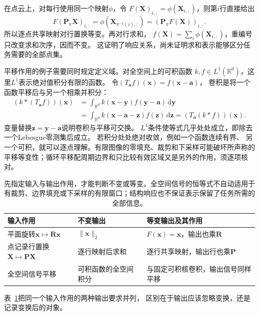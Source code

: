 在点云上，对每行使用同一个映射$\phi$，令
$F(\bm X)_{i,:}=\phi(\bm X_{i,:})$，则第$i$行直接给出
\[
 F(\bm P_\pi\bm X)_{i,:}
 =\phi(\bm X_{\pi^{-1}(i),:})
 =(\bm P_\pi F(\bm X))_{i,:}.
\]
所以逐点共享映射对行置换等变。再对行求和，
$f(\bm X)=\sum_i\phi(\bm X_{i,:})$，重编号只改变求和次序，因而不变。
这证明了响应关系，尚未证明求和表示能够区分任务需要的全部点集。

平移作用的例子需要同时规定定义域。对全空间上的可积函数
$k,f\in L^1(\mathbb R^d)$，这里$L^1$表示绝对值积分有限的函数。
令$(T_{\bm a}f)(\bm x)=f(\bm x-\bm a)$，
卷积是将一个函数平移后与另一个相乘并积分：
\begin{align}
 (k*(T_{\bm a}f))(\bm x)
 &=\int_{\mathbb R^d}k(\bm x-\bm y)f(\bm y-\bm a)\,\mathrm d\bm y\\
 &=\int_{\mathbb R^d}k(\bm x-\bm a-\bm z)f(\bm z)\,\mathrm d\bm z
   =(T_{\bm a}(k*f))(\bm x).
 \label{eq:geometry-translation-convolution-equivariance}
\end{align}
变量替换$\bm z=\bm y-\bm a$说明卷积与平移可交换。
$L^1$条件使等式几乎处处成立，即除去一个Lebesgue零测集后成立。
若积分处处绝对收敛，例如一个函数连续有界、
另一个可积，就可以逐点理解。有限图像的零填充、裁剪和下采样可能破坏所声称的
平移等变性；循环平移配周期边界和只比较有效区域又是另外的作用，须逐项核对。

\begin{table}[htbp]
 \centering\small
 \begin{tabularx}{\linewidth}{@{}lXX@{}}
 \toprule
 输入作用 & 不变输出 & 等变输出及其作用\\
 \midrule
 平面旋转$\bm x\mapsto\bm R\bm x$
 & $\lVert\bm x\rVert_2$ & $F(\bm x)=\bm x$，输出也乘$\bm R$\\
 点记录行置换$\bm X\mapsto\bm P\bm X$
 & 逐行映射后求和 & 逐行共享映射，输出行也乘$\bm P$\\
 全空间信号平移
 & 可积函数的全空间积分 & 与固定可积核卷积，输出信号同样平移\\
 \bottomrule
 \end{tabularx}
 \caption{先指定输入与输出作用，才能判断不变或等变。全空间信号的恒等式不自动适用于
 有裁剪、边界填充或下采样的有限窗口；结构响应也不保证表示保留了任务所需的全部信息。}
 \label{tab:geometry-invariance-equivariance}
\end{table}
表~\ref{tab:geometry-invariance-equivariance}把同一个输入作用的两种输出要求并列，
区别在于输出应该忽略变换，还是记录变换后的对象。


